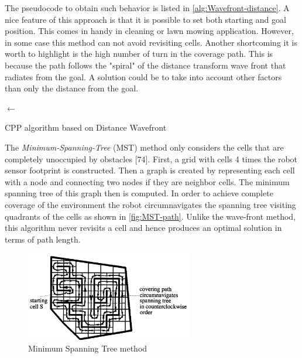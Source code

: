 The pseudocode to obtain such behavior is listed in \autoref{alg:Wavefront-distance}. 
A nice feature of this approach is that it is possible to set both starting and goal position. This comes in handy in cleaning or lawn mowing application. However, in some case this method can not avoid revisiting cells. Another shortcoming it is worth to highlight is the high number of turn in the coverage path. This is because the path follows the "spiral" of the distance transform wave front that radiates from the goal. A solution could be to take into account other factors than only the distance from the goal.\par
\begin{algorithm}

	\BlankLine
	\SCell $\leftarrow$ \CCell \;
\caption{CPP algorithm based on Distance Wavefront}
\label{alg:Wavefront-distance}
\end{algorithm}
The \textit{Minimum-Spanning-Tree} (MST) method only considers the cells that are completely unoccupied by obstacles [74]. First, a grid with cells 4 times the robot sensor footprint is constructed. Then a graph is created by representing each cell with a node and connecting two nodes if they are neighbor cells. The minimum spanning tree of this graph then is computed. In order to achieve complete coverage of the environment the robot circumnavigates the spanning tree visiting quadrants of the cells as shown in \autoref{fig:MST-path}. Unlike the wave-front method, this algorithm never revisits a cell and hence produces an optimal solution in terms of path length. 
\begin{figure}[ht]
    \centering
    \includegraphics[width=0.65\textwidth]{figures/C3/MST-path.png}
    \caption{Minimum Spanning Tree method}
    \label{fig:MST-path}
\end{figure}

